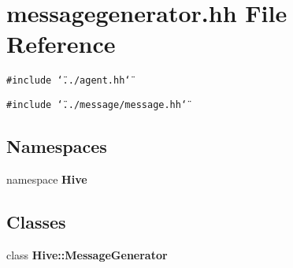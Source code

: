 \section{messagegenerator.hh File Reference}
\label{messagegenerator_8hh}


{\tt \#include \char`\"{}../agent.hh\char`\"{}}\par
{\tt \#include \char`\"{}../message/message.hh\char`\"{}}\par
\subsection*{Namespaces}
\begin{CompactItemize}
\item 
namespace {\bf Hive}
\end{CompactItemize}
\subsection*{Classes}
\begin{CompactItemize}
\item 
class {\bf Hive::MessageGenerator}
\end{CompactItemize}
